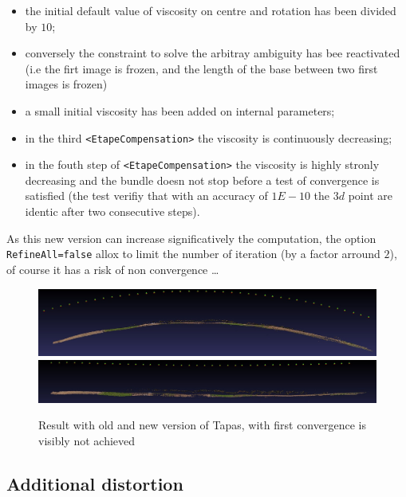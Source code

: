 \begin{itemize}
    \item  the initial default value of viscosity  on centre and rotation has been divided by $10$;
    \item  conversely the constraint to solve the arbitray ambiguity has bee reactivated (i.e the firt image is
           frozen, and the length of the base between two first images is frozen)
    \item  a small initial viscosity has been added on internal parameters;
    \item  in the third {\tt <EtapeCompensation>} the viscosity is continuously decreasing;
    \item  in the fouth step of  {\tt <EtapeCompensation>} the viscosity is highly stronly decreasing and
           the bundle doesn not stop before a test of convergence is satisfied (the test verifiy that with an
           accuracy of $1E-10$ the $3d$ point are identic after two consecutive steps).
\end{itemize}

As this new version can increase significatively the computation, the option {\tt RefineAll=false}
allox to limit the number of iteration (by a factor arround $2$), of course it has a risk of non convergence \dots


\begin{figure}
\begin{center}
   \includegraphics[width=120mm]{FIGS/NewTapas/Old00.jpg}
   \includegraphics[width=120mm]{FIGS/NewTapas/New00.jpg}
\end{center}
\caption{Result with old and new version of Tapas, with first convergence is visibly not achieved}
\label{ImOldNewTapas}
\end{figure}



\subsection{Additional distortion}

